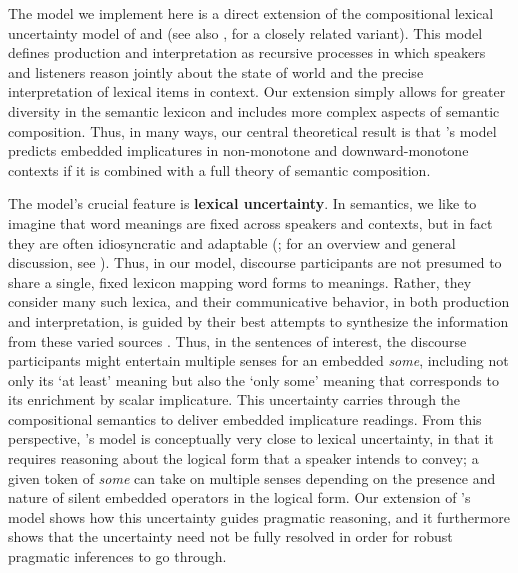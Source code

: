 \documentclass[leqno,12pt]{article}
\newcommand{\word}[1]{\emph{#1}}
\newcommand{\tech}[1]{\textbf{#1}}
\begin{document}
{The model we implement here is a direct extension of the compositional
lexical uncertainty model of \citet{Bergen:Goodman:Levy:2012} and
\citet{Bergen:Levy:Goodman:2014} (see also
\citealp{lassiter-goodman:2013SALT,lassitergoodman15}, for a closely related
variant). This model defines production and
interpretation as recursive processes in which speakers and listeners
reason jointly about the state of world and the precise interpretation
of lexical items in context.  Our extension simply allows for greater
diversity in the semantic lexicon and includes more complex aspects of
semantic composition. Thus, in many ways, our central theoretical
result is that \citeauthor{Bergen:Levy:Goodman:2014}'s model predicts
embedded implicatures in non-monotone and downward-monotone contexts
if it is combined with a full theory of semantic composition.

The model's crucial feature is \tech{lexical uncertainty}.  In
semantics, we like to imagine that word meanings are fixed across
speakers and contexts, but in fact they are often idiosyncratic and
adaptable
(\citealt{clark-clark79,Clark97,Lascarides:Copestake:1998,Glucksberg:2001};
for an overview and general discussion, see
\citealt{Wilson:Carston:2007}).  Thus, in our model, discourse
participants are not presumed to share a single, fixed lexicon mapping
word forms to meanings. Rather, they consider many such lexica, and
their communicative behavior, in both production and interpretation,
is guided by their best attempts to synthesize the information from
these varied sources \citep{Giles:Coupland:Coupland:1991}. Thus, in
the sentences of interest, the discourse participants might entertain
multiple senses for an embedded \word{some}, including not only its
`at least' meaning but also the `only some' meaning that corresponds
to its enrichment by scalar implicature. This uncertainty carries
through the compositional semantics to deliver embedded implicature
readings. From this perspective, \citeauthor{ChierchiaFoxSpector08}'s
model is conceptually very close to lexical uncertainty, in that it
requires reasoning about the logical form that a speaker intends to
convey; a given token of \word{some} can take on multiple senses
depending on the presence and nature of silent embedded operators in
the logical form. Our extension of
\citeauthor{Bergen:Levy:Goodman:2014}'s model shows how this
uncertainty guides pragmatic reasoning, and it furthermore shows that
the uncertainty need not be fully resolved in order for robust
pragmatic inferences to go through.



}
\end{document}
